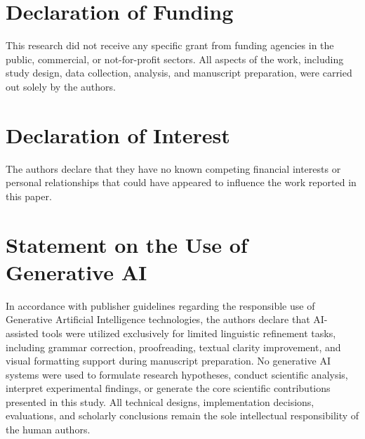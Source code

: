 \section*{Declaration of Funding}

This research did not receive any specific grant from funding agencies in the public, commercial, or not-for-profit sectors. All aspects of the work, including study design, data collection, analysis, and manuscript preparation, were carried out solely by the authors.

\section*{Declaration of Interest}
The authors declare that they have no known competing financial interests or personal relationships that could have appeared to influence the work reported in this paper.

\section*{Statement on the Use of Generative AI}

\hspace*{2em}In accordance with publisher guidelines regarding the responsible use of Generative Artificial Intelligence technologies, the authors declare that AI-assisted tools were utilized exclusively for limited linguistic refinement tasks, including grammar correction, proofreading, textual clarity improvement, and visual formatting support during manuscript preparation. No generative AI systems were used to formulate research hypotheses, conduct scientific analysis, interpret experimental findings, or generate the core scientific contributions presented in this study. All technical designs, implementation decisions, evaluations, and scholarly conclusions remain the sole intellectual responsibility of the human authors.

\clearpage

\backmatter

